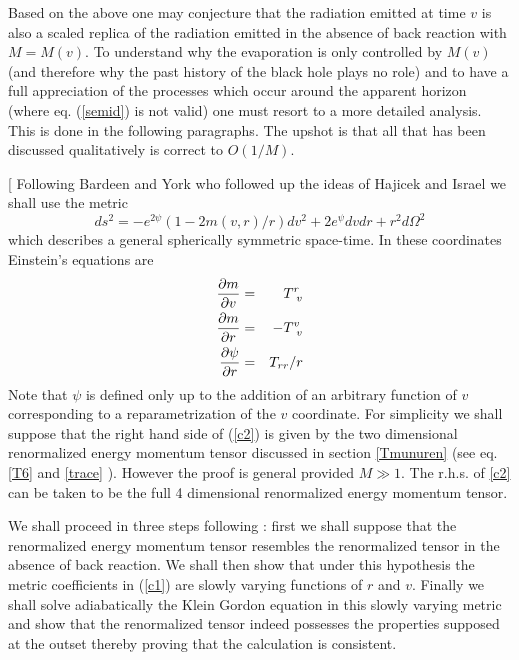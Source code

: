 \documentclass[12pt,oneside]{report}
\begin{document}
Based on the above one may conjecture that the radiation emitted at time $v$ is
also a scaled replica of the radiation emitted in the absence of back reaction
with $M=M(v)$. To understand why the evaporation is only controlled by $M(v)$
(and therefore why the past 
history of the black hole plays no role) and to have a full
appreciation of the processes which occur around the apparent horizon 
(where eq. (\ref{semid}) is not valid)
one must
resort to a more detailed analysis. This is done in the following paragraphs.
The upshot is that all that has been discussed qualitatively is correct to $O
(1/M)$. 
 

[ Following Bardeen\cite{Bard} and York\cite{York} who
followed up the ideas of 
Hajicek and Israel \cite{HI} we shall use the metric 
\begin{equation}
ds^2=-e^{2 \psi}(1-2m(v,r)/r)dv^2 + 2 e^\psi dvdr 
+r^2 d\Omega^2
\label{c1}
\end{equation}
which describes a general spherically symmetric space-time.
In these coordinates Einstein's
equations are
\begin{eqnarray}
{\partial m \over \partial v} &=&  T^r_{\
v}\nonumber\\
{\partial m \over \partial r} &=& - T^v_{\
v}\nonumber\\
{\partial \psi \over \partial r} &=& 
T_{rr} /r
\label{c2}
\end{eqnarray}
Note that $\psi$ is defined only up to the addition of an arbitrary
function of $v$ corresponding to a reparametrization of the $v$ coordinate.
For simplicity we shall suppose that the right hand side 
of (\ref{c2}) is given by the two dimensional
renormalized energy momentum tensor discussed in section \ref{Tmunuren} (see
eq. \ref{T6} and \ref{trace} ). However the proof is general provided $M\gg1$. 
The r.h.s. of \ref{c2} can be taken to be the full 4 dimensional renormalized
energy momentum tensor.

We shall proceed in three steps following \cite{Massar2}: first we
shall suppose that the renormalized energy momentum tensor resembles the
renormalized tensor in the absence of back reaction. We shall then show
that under this hypothesis the metric coefficients in
(\ref{c1}) are slowly varying functions of $r$ and $v$. Finally we shall solve
adiabatically the Klein Gordon equation in this slowly varying metric and
show that the renormalized tensor indeed possesses the
properties supposed at the outset thereby proving that the calculation is
consistent.
\end{document}
